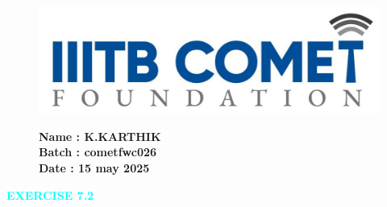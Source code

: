 \documentclass[a4paper,12pt]{article}
\begin{document}
                                                                   \begin{figure}[h!]
    \begin{minipage}{0.45\textwidth}  %
        \includegraphics[width=\textwidth]{sun.png}  %
    \end{minipage} \hfill
    \begin{minipage}{0.45\textwidth}  %
        \textbf{Name : K.KARTHIK} \\
    \textbf{Batch : cometfwc026} \\
  \textbf{Date : 15 may 2025}
    \end{minipage}
\end{figure}
\begin{center}
  \textcolor{cyan}{\textbf{\Large EXERCISE 7.2}}
\end{center}
\end{document}
